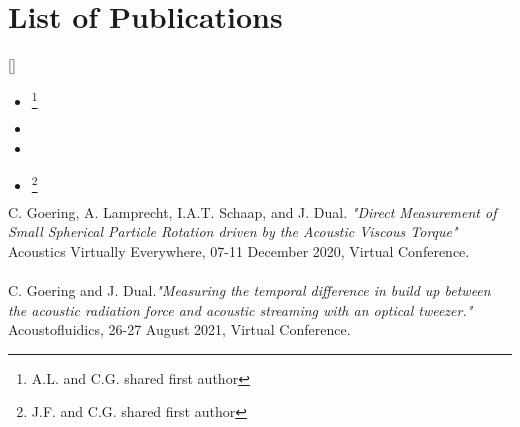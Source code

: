 \chapter*{List of Publications}


\makeatletter
\DeclareCiteCommand{\fullcite}
  {%
    }
  {\usedriver
     {}
     {}}
  {\multicitedelim}
  {}
\DeclareCiteCommand{\footfullcite}[\mkbibfootnote]
  {%
    }
  {\usedriver
     {}
     {}}
  {\multicitedelim}
  {}
\makeatother

\begin{itemize}
  \item {}\footnote{A.L. and C.G. shared first author}
  \item {}
  \item {}
  \item {}\footnote{J.F. and C.G. shared first author}
\end{itemize}


C. Goering, A. Lamprecht, I.A.T. Schaap, and J. Dual.  \emph{"Direct 
Measurement of Small Spherical Particle Rotation driven by the Acoustic Viscous 
Torque"} Acoustics Virtually Everywhere, 07-11 December 2020, Virtual 
Conference.\\
  \\
C. Goering and J. Dual.\emph{"Measuring the temporal difference in build up 
between the acoustic radiation force and acoustic streaming with an optical 
tweezer."} Acoustofluidics, 26-27 August 2021, Virtual Conference.\\
